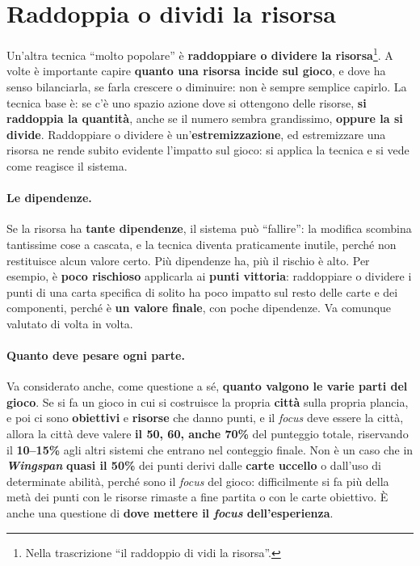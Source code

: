 \section{Raddoppia o dividi la risorsa}
\label{a14:sec:raddoppia}

Un'altra tecnica ``molto popolare'' è \textbf{raddoppiare o dividere la risorsa}\footnote{Nella
trascrizione ``il raddoppio di vidi la risorsa''.}. A volte è importante capire \textbf{quanto
una risorsa incide sul gioco}, e dove ha senso bilanciarla, se farla crescere o diminuire: non
è sempre semplice capirlo. La tecnica base è: se c'è uno spazio azione dove si ottengono delle
risorse, \textbf{si raddoppia la quantità}, anche se il numero sembra grandissimo,
\textbf{oppure la si divide}. Raddoppiare o dividere è un'\textbf{estremizzazione}, ed
estremizzare una risorsa ne rende subito evidente l'impatto sul gioco: si applica la tecnica e
si vede come reagisce il sistema.

\paragraph{Le dipendenze.} Se la risorsa ha \textbf{tante dipendenze}, il sistema può
``fallire'': la modifica scombina tantissime cose a cascata, e la tecnica diventa praticamente
inutile, perché non restituisce alcun valore certo. Più dipendenze ha, più il rischio è alto.
Per esempio, è \textbf{poco rischioso} applicarla ai \textbf{punti vittoria}: raddoppiare o
dividere i punti di una carta specifica di solito ha poco impatto sul resto delle carte e dei
componenti, perché è \textbf{un valore finale}, con poche dipendenze. Va comunque valutato di
volta in volta.

\paragraph{Quanto deve pesare ogni parte.} Va considerato anche, come questione a sé,
\textbf{quanto valgono le varie parti del gioco}. Se si fa un gioco in cui si costruisce la
propria \textbf{città} sulla propria plancia, e poi ci sono \textbf{obiettivi} e
\textbf{risorse} che danno punti, e il \emph{focus} deve essere la città, allora la città deve
valere \textbf{il 50, 60, anche 70\%} del punteggio totale, riservando il \textbf{10--15\%}
agli altri sistemi che entrano nel conteggio finale. Non è un caso che in
\textbf{\emph{Wingspan}} \textbf{quasi il 50\%} dei punti derivi dalle \textbf{carte uccello} o
dall'uso di determinate abilità, perché sono il \emph{focus} del gioco: difficilmente si fa più
della metà dei punti con le risorse rimaste a fine partita o con le carte obiettivo. È anche una
questione di \textbf{dove mettere il \emph{focus} dell'esperienza}.

